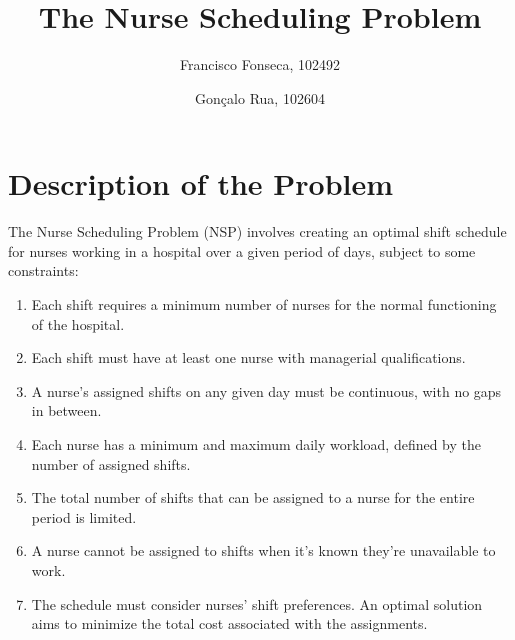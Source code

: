 \documentclass[sigconf, 11pt]{acmart}
\begin{document}
\title{The Nurse Scheduling Problem}

\author{Francisco Fonseca, 102492}
\author{Gonçalo Rua, 102604}
\authornotemark[1]

\renewcommand{\shortauthors}{Francisco Fonseca, Gonçalo Rua}

\maketitle

\section{Description of the Problem}
The Nurse Scheduling Problem (NSP) involves creating an optimal shift schedule for nurses working in a hospital over a given period of days, subject to some constraints:

\begin{enumerate}
    \item Each shift requires a minimum number of nurses for the normal functioning of the hospital.
    \item Each shift must have at least one nurse with managerial qualifications.
    \item A nurse's assigned shifts on any given day must be continuous, with no gaps in between.
    \item Each nurse has a minimum and maximum daily workload, defined by the number of assigned shifts.
    \item The total number of shifts that can be assigned to a nurse for the entire period is limited.
    \item A nurse cannot be assigned to shifts when it's known they're unavailable to work.
    \item The schedule must consider nurses' shift preferences. An optimal solution aims to minimize the total cost associated with the assignments.
\end{enumerate}
\end{document}
